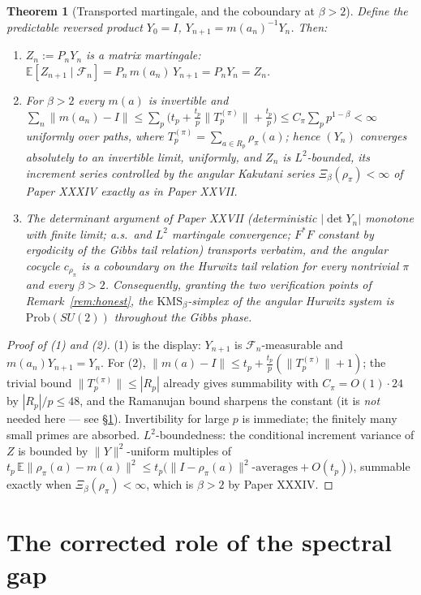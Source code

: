 \documentclass[11pt]{amsart}
\newtheorem{theorem}{Theorem}[section]
\theoremstyle{remark}
\newcommand{\E}{\mathbb{E}}
\newcommand{\Prob}{\mathrm{Prob}}
\newcommand{\F}{\mathcal{F}}
\begin{document}
\begin{theorem}[Transported martingale, and the coboundary at $\beta>2$]\label{thm:transport}
Define the predictable reversed product $Y_0=I$, $Y_{n+1}=m(a_n)^{-1}Y_n$. Then:
\begin{enumerate}
\item $Z_n:=P_nY_n$ is a matrix martingale:
$\E[Z_{n+1}\mid\F_n]=P_n\,m(a_n)\,Y_{n+1}=P_nY_n=Z_n$.
\item For $\beta>2$ every $m(a)$ is invertible and
$\sum_n\|m(a_n)-I\|\le\sum_p\bigl(t_p+\tfrac{t_p}{p}\|T_p^{(\pi)}\|+\tfrac{t_p}{p}\bigr)
\le C_\pi\sum_p p^{1-\beta}<\infty$
uniformly over paths, where $T_p^{(\pi)}=\sum_{a\in R_p}\rho_\pi(a)$; hence
$(Y_n)$ converges absolutely to an invertible limit, uniformly, and $Z_n$ is
$L^2$-bounded, its increment series controlled by the angular Kakutani series
$\Xi_\beta(\rho_\pi)<\infty$ of Paper XXXIV exactly as in Paper XXVII.
\item The determinant argument of Paper XXVII (deterministic $|\det Y_n|$ monotone with
finite limit; a.s.\ and $L^2$ martingale convergence; $F^*F$ constant by ergodicity of
the Gibbs tail relation) transports verbatim, and the angular cocycle $c_{\rho_\pi}$ is
a coboundary on the Hurwitz tail relation for every nontrivial $\pi$ and every
$\beta>2$. Consequently, granting the two verification points of
Remark~\ref{rem:honest}, the $\mathrm{KMS}_\beta$-simplex of the angular Hurwitz system
is $\Prob(SU(2))$ throughout the Gibbs phase.
\end{enumerate}
\end{theorem}

\begin{proof}[Proof of (1) and (2)]
(1) is the display: $Y_{n+1}$ is $\F_n$-measurable and $m(a_n)Y_{n+1}=Y_n$. For (2),
$\|m(a)-I\|\le t_p+\frac{t_p}{p}(\|T_p^{(\pi)}\|+1)$; the trivial bound
$\|T_p^{(\pi)}\|\le|R_p|$ already gives summability with $C_\pi=O(1)\cdot24$ by
$|R_p|/p\le48$, and the Ramanujan bound sharpens the constant (it is \emph{not} needed
here --- see \S\ref{sec:LPS}). Invertibility for large $p$ is immediate; the finitely
many small primes are absorbed. $L^2$-boundedness: the conditional increment variance of
$Z$ is bounded by $\|Y\|^2$-uniform multiples of
$t_p\,\E\|\rho_\pi(a)-m(a)\|^2\le t_p\bigl(\|I-\rho_\pi(a)\|^2\text{-averages}+O(t_p)\bigr)$,
summable exactly when $\Xi_\beta(\rho_\pi)<\infty$, which is $\beta>2$ by Paper XXXIV.
\end{proof}

\section{The corrected role of the spectral gap}\label{sec:LPS}
\end{document}
